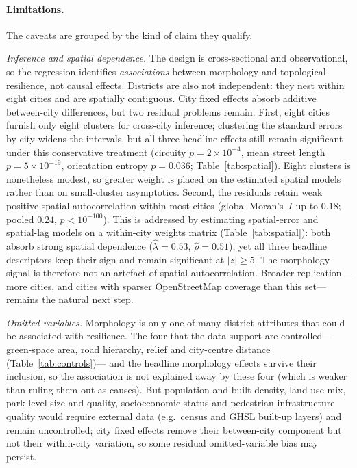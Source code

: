 \documentclass[sn-mathphys-num,pdflatex]{sn-jnl}
\begin{document}
\paragraph{Limitations.} The caveats are grouped by the kind of claim they qualify.

\emph{Inference and spatial dependence.} The design is cross-sectional and
observational, so the regression identifies \emph{associations} between morphology
and topological resilience, not causal effects. Districts are also not independent:
they nest within eight cities and are spatially contiguous. City fixed effects
absorb additive between-city differences, but two residual problems remain. First,
eight cities furnish only eight clusters for cross-city inference; clustering the
standard errors by city widens the intervals, but all three headline effects still
remain significant under this conservative treatment (circuity $p=2\times10^{-4}$,
mean street length $p=5\times10^{-19}$, orientation entropy $p=0.036$;
Table~\ref{tab:spatial}). Eight clusters is nonetheless modest, so greater weight is placed on the
estimated spatial models rather than on small-cluster asymptotics. Second, the
residuals retain weak positive spatial autocorrelation within most cities (global
Moran's~$I$ up to $0.18$; pooled $0.24$, $p<10^{-100}$). This is addressed by
estimating spatial-error and spatial-lag models on a within-city weights matrix
(Table~\ref{tab:spatial}): both absorb strong spatial dependence
($\hat\lambda=0.53$, $\hat\rho=0.51$), yet all three headline descriptors keep their
sign and remain significant at $|z|\ge5$. The morphology signal is therefore not an
artefact of spatial autocorrelation. Broader replication---more cities, and cities
with sparser OpenStreetMap coverage than this set---remains the natural next step.

\emph{Omitted variables.} Morphology is only one of many district attributes that
could be associated with resilience. The four that the data
support are controlled---green-space
area, road hierarchy, relief and city-centre distance (Table~\ref{tab:controls})---
and the headline morphology effects survive their inclusion, so the association is
not explained away by these four (which is weaker than ruling them out as causes).
But population and built density, land-use mix, park-level size
and quality, socioeconomic status and pedestrian-infrastructure quality would
require external data (e.g.\ census and GHSL built-up layers) and remain
uncontrolled; city fixed effects remove their between-city component but not their
within-city variation, so some residual omitted-variable bias may persist.
\end{document}
